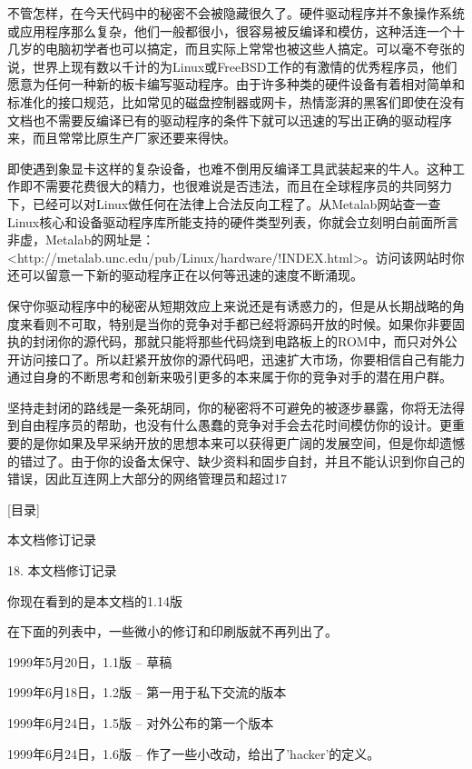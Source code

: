 \documentclass[a4paper,12pt,UTF8,twoside]{ctexbook}
\begin{document}
不管怎样，在今天代码中的秘密不会被隐藏很久了。硬件驱动程序并不象操作系统或应用程序那么复杂，他们一般都很小，很容易被反编译和模仿，这种活连一个十几岁的电脑初学者也可以搞定，而且实际上常常也被这些人搞定。可以毫不夸张的说，世界上现有数以千计的为Linux或FreeBSD工作的有激情的优秀程序员，他们愿意为任何一种新的板卡编写驱动程序。由于许多种类的硬件设备有着相对简单和标准化的接口规范，比如常见的磁盘控制器或网卡，热情澎湃的黑客们即使在没有文档也不需要反编译已有的驱动程序的条件下就可以迅速的写出正确的驱动程序来，而且常常比原生产厂家还要来得快。


即使遇到象显卡这样的复杂设备，也难不倒用反编译工具武装起来的牛人。这种工作即不需要花费很大的精力，也很难说是否违法，而且在全球程序员的共同努力下，已经可以对Linux做任何在法律上合法反向工程了。从Metalab网站查一查Linux核心和设备驱动程序库所能支持的硬件类型列表，你就会立刻明白前面所言非虚，Metalab的网址是：<http://metalab.unc.edu/pub/Linux/hardware/!INDEX.html>。访问该网站时你还可以留意一下新的驱动程序正在以何等迅速的速度不断涌现。


保守你驱动程序中的秘密从短期效应上来说还是有诱惑力的，但是从长期战略的角度来看则不可取，特别是当你的竞争对手都已经将源码开放的时候。如果你非要固执的封闭你的源代码，那就只能将那些代码烧到电路板上的ROM中，而只对外公开访问接口了。所以赶紧开放你的源代码吧，迅速扩大市场，你要相信自己有能力通过自身的不断思考和创新来吸引更多的本来属于你的竞争对手的潜在用户群。


坚持走封闭的路线是一条死胡同，你的秘密将不可避免的被逐步暴露，你将无法得到自由程序员的帮助，也没有什么愚蠢的竞争对手会去花时间模仿你的设计。更重要的是你如果及早采纳开放的思想本来可以获得更广阔的发展空间，但是你却遗憾的错过了。由于你的设备太保守、缺少资料和固步自封，并且不能认识到你自己的错误，因此互连网上大部分的网络管理员和超过17%


[目录]

本文档修订记录

18. 本文档修订记录

你现在看到的是本文档的1.14版


在下面的列表中，一些微小的修订和印刷版就不再列出了。


1999年5月20日，1.1版 -- 草稿

1999年6月18日，1.2版 -- 第一用于私下交流的版本

1999年6月24日，1.5版 -- 对外公布的第一个版本

1999年6月24日，1.6版 -- 作了一些小改动，给出了'hacker'的定义。
\end{document}
